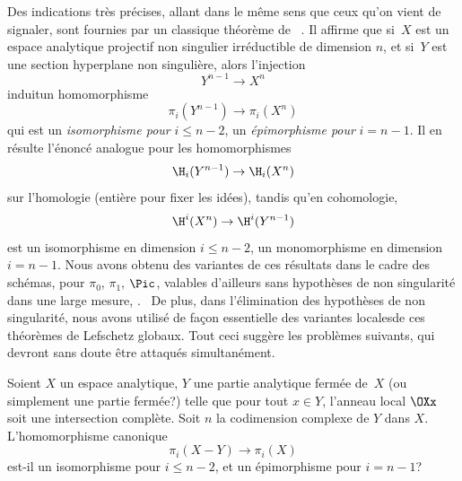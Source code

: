Des indications tr\`es pr\'ecises, allant dans le m\^eme sens que ceux qu'on vient de signaler, sont fournies par un classique th\'eor\`eme de ~\cite{XIII.7}. Il affirme que si~$X$ est un espace analytique projectif non singulier irr\'eductible de dimension $n$, et si~$Y$ est une section hyperplane non singuli\`ere, alors l'injection
$$Y^{n-1}\to X^n$$
induit\pageoriginale un homomorphisme
$$
\pi_i(Y^{n-1})\to \pi_i(X^n)$$
qui est un \emph{isomorphisme pour} $i\le n-2$, un \emph{\'epimorphisme pour} $i=n-1$. Il en r\'esulte l'\'enonc\'e analogue pour les homomorphismes
$$
\H_i(Y^{n-1})\to \H_i(X^n)$$
sur l'homologie (enti\`ere pour fixer les id\'ees), tandis qu'en cohomologie,
$$
\H^i(X^n)\to\H^i(Y^{n-1})
$$
est un isomorphisme en dimension $i\le n-2$, un monomorphisme en dimension $i=n-1$. Nous avons obtenu des variantes de ces r\'esultats dans le cadre des sch\'emas, pour $\pi_0$, $\pi_1$, $\Pic$, valables d'ailleurs sans hypoth\`eses de non singularit\'e dans une large mesure, \cf \Exp {}. \ De plus, dans l'\'elimination des hypoth\`eses de non singularit\'e, nous avons utilis\'e de fa\c con essentielle des variantes \og locales\fg de ces th\'eor\`emes de Lefschetz globaux. Tout ceci sugg\`ere les probl\`emes suivants, qui devront sans doute \^etre attaqu\'es simultan\'ement.

\begin{probleme} \label{XIII.4.1}
Soient $X$ un espace analytique, $Y$ une partie analytique ferm\'ee de~$X$ (ou simplement une partie ferm\'ee?) telle que pour tout $x\in Y$, l'anneau local $\OXx$ soit une intersection compl\`ete. Soit $n$ la codimension complexe de $Y$ dans $X$. L'homomorphisme canonique
$$
\pi_i(X-Y)\to \pi_i(X)$$
est-il un isomorphisme pour $i\le n-2$, et un \'epimorphisme pour $i=n-1$?
\end{probleme}

